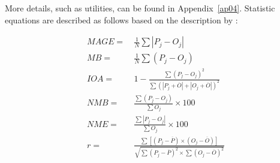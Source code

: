 More details, such as utilities, can be found in Appendix~\ref{ap04}. Statistic equations are described as follows based on the description by \citet{Emery2017}:
  
  \begin{align}
  MAGE =&~ \frac{1}{N}\sum|P_j - O_j| \\
  MB = &~  \frac{1}{N}\sum(P_j - O_j)\\
  IOA = &~ 1 - \frac{\sum(P_j-O_j)^2}{\sum(|P_j+\overline{O}|+|O_j+\overline{O}|)^2}\\
  NMB =&~ \frac{\sum(P_j-O_j)}{\sum O_j}\times 100\\
  NME =&~ \frac{\sum|P_j-O_j|}{\sum O_j}\times 100\\
  r =&~ \frac{\sum[(P_j-\overline{P})\times(O_j-\overline{O})]}{\sqrt{\sum(P_j-\overline{P})^2\times \sum(O_j-\overline{O})^2}}
  \end{align} 
    

